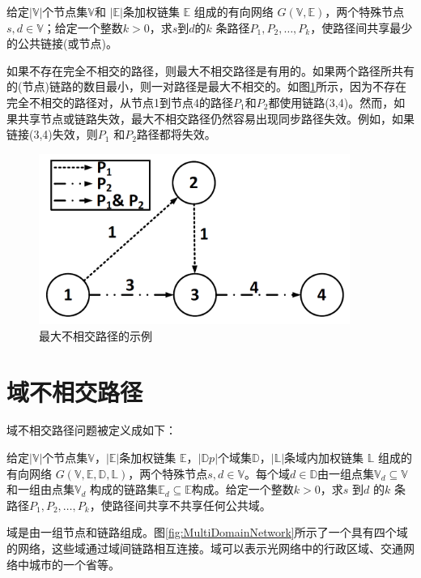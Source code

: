 \begin{definition}[最大不相交路径问题]
给定$|\mathbb{V}|$个节点集$\mathbb{V}$和 $|\mathbb{E}|$条加权链集 $\mathbb{E}$ 组成的有向网络 $G(\mathbb{V},\mathbb{E})$，两个特殊节点$s,d\in\mathbb{V}$；给定一个整数$k>0$，求$s$到$d$的$k$ 条路径$P_1,P_2,\ldots,P_k$，使路径间共享最少的公共链接(或节点)。
\end{definition}
如果不存在完全不相交的路径，则最大不相交路径是有用的。如果两个路径所共有的(节点)链路的数目最小，则一对路径是最大不相交的。如图\ref{fig:MaximallyDisjointPaths}所示，因为不存在完全不相交的路径对，从节点1到节点4的路径$P_1$和$P_2$都使用链路(3,4)。然而，如果共享节点或链路失效，最大不相交路径仍然容易出现同步路径失效。例如，如果链接(3,4)失效，则$P_1$ 和$P_2$路径都将失效。
\begin{figure}[htbp]
  \centering
  \includegraphics[width=4.0in]{figures/MaximallyDisjointPaths}
  \caption{最大不相交路径的示例}
  \label{fig:MaximallyDisjointPaths}
\end{figure}

\section{域不相交路径}
域不相交路径问题被定义成如下：

\begin{definition}[域不相交路径问题]
给定$|\mathbb{V}|$个节点集$\mathbb{V}$，$|\mathbb{E}|$条加权链集 $\mathbb{E}$，$|\mathbb{D}p|$个域集$\mathbb{D}$，$|\mathbb{L}|$条域内加权链集 $\mathbb{L}$ 组成的有向网络 $G(\mathbb{V},\mathbb{E},\mathbb{D},\mathbb{L})$，两个特殊节点$s,d\in\mathbb{V}$。每个域$d\in\mathbb{D}$由一组点集$\mathbb{V}_d\subseteq \mathbb{V}$和一组由点集$\mathbb{V}_d$ 构成的链路集$\mathbb{E}_d\subseteq \mathbb{E}$构成。给定一个整数$k>0$，求$s$ 到$d$ 的$k$ 条路径$P_1,P_2,\ldots,P_k$，使路径间共享不共享任何公共域。
\end{definition}

域是由一组节点和链路组成。图\ref{fig:MultiDomainNetwork}所示了一个具有四个域的网络，这些域通过域间链路相互连接。域可以表示光网络中的行政区域、交通网络中城市的一个省等。


